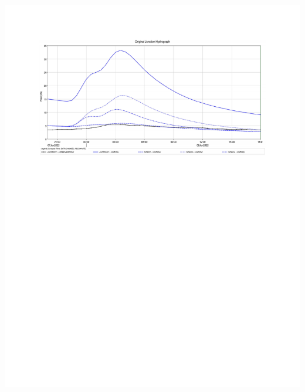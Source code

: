 \documentclass{article}
\begin{document}
\begin{center}
\includegraphics*[scale=0.9, trim = {1.5cm 17cm 0 2.96cm}]{results/Junction_Results.pdf}
\newpage


\end{center}
\end{document}
